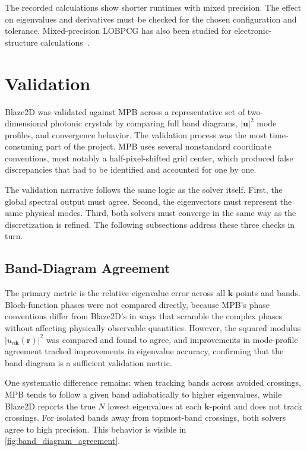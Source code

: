 The recorded calculations show shorter runtimes with mixed precision.
The effect on eigenvalues and derivatives must be checked for the chosen
configuration and tolerance. Mixed-precision LOBPCG has also been studied
for electronic-structure calculations~\cite{woo2023}.

\section{Validation}\label{sec:validation}

Blaze2D was validated against MPB across a representative set of
two-dimensional photonic crystals by comparing full band diagrams,
$|\bm{u}|^{2}$ mode profiles, and convergence behavior. The validation
process was the most time-consuming part of the project. MPB uses
several nonstandard coordinate conventions, most notably a
half-pixel-shifted grid center, which produced false discrepancies
that had to be identified and accounted for one by one.

The validation narrative follows the same logic as the solver itself.
First, the global spectral output must agree. Second, the eigenvectors
must represent the same physical modes. Third, both solvers must
converge in the same way as the discretization is refined. The
following subsections address these three checks in turn.

\subsection{Band-Diagram Agreement}\label{sec:band_agreement}

The primary metric is the relative eigenvalue error across all
$\bm{k}$-points and bands. Bloch-function phases were not compared
directly, because MPB's phase conventions differ from Blaze2D's in
ways that scramble the complex phases without affecting physically
observable quantities. However, the squared modulus
$|u_{n\bm{k}}(\bm{r})|^{2}$ was compared and found to agree, and
improvements in mode-profile agreement tracked improvements in
eigenvalue accuracy, confirming that the band diagram is a sufficient
validation metric.

One systematic difference remains: when tracking bands across avoided
crossings, MPB tends to follow a given band adiabatically to higher
eigenvalues, while Blaze2D reports the true $N$ lowest eigenvalues at
each $\bm{k}$-point and does not track crossings. For isolated bands
away from topmost-band crossings, both solvers agree to high
precision. This behavior is visible in \cref{fig:band_diagram_agreement}.

